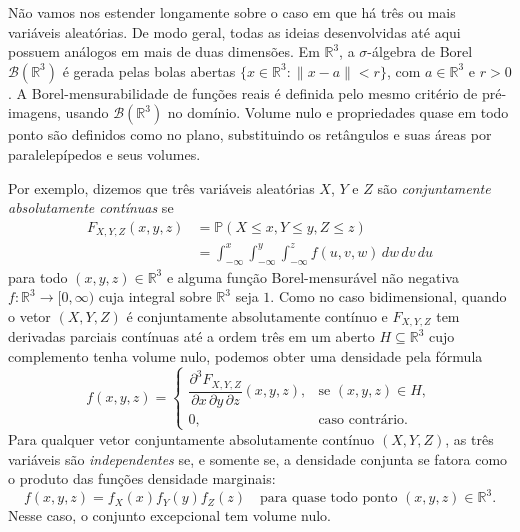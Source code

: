 \documentclass[12pt,portuguese]{article}
\theoremstyle{definition}
\theoremstyle{plainexercise}
\theoremstyle{starredexercise}
\theoremstyle{definition}
\begin{document}
Não vamos nos estender longamente sobre o caso em que há três ou mais
variáveis aleatórias. De modo geral, todas as ideias desenvolvidas até
aqui possuem análogos em mais de duas dimensões. Em $\mathbb{R}^3$, a
$\sigma$-álgebra de Borel $\mathscr{B}(\mathbb{R}^3)$ é gerada pelas bolas
abertas $\{x \in \mathbb{R}^3 : \|x-a\| < r\}$, com
$a \in \mathbb{R}^3$ e $r > 0$. A Borel-mensurabilidade de funções reais
é definida pelo mesmo critério de pré-imagens, usando
$\mathscr{B}(\mathbb{R}^3)$ no domínio. Volume nulo e propriedades quase
em todo ponto são definidos como no plano, substituindo os retângulos
e suas áreas por paralelepípedos e seus volumes.

Por exemplo, dizemos que
três variáveis aleatórias $X$, $Y$ e $Z$ são
\emph{conjuntamente absolutamente contínuas} se
\[
  \begin{aligned}
    F_{X,Y,Z}(x,y,z)
    &= \mathbb{P}(X \leqslant x, Y \leqslant y, Z \leqslant z)
    \\[0.3cm]
    &= \int_{-\infty}^{x}\int_{-\infty}^{y}\int_{-\infty}^{z}
    f(u, v, w)\,dw\,dv\,du
  \end{aligned}
\]
para todo $(x,y,z) \in \mathbb{R}^3$ e alguma função Borel-mensurável
não negativa $f:\mathbb{R}^3\to[0,\infty)$ cuja integral sobre
$\mathbb{R}^3$ seja $1$. Como no caso bidimensional, quando o vetor
$(X,Y,Z)$ é conjuntamente absolutamente contínuo e $F_{X,Y,Z}$
tem derivadas parciais contínuas até a ordem três em um aberto
$H \subseteq \mathbb{R}^3$ cujo complemento tenha volume nulo,
podemos obter uma densidade pela fórmula
\[
  f(x, y, z) =
  \begin{cases}
    \dfrac{\partial^3 F_{X,Y,Z}}{
    \partial x\,\partial y\,\partial z}(x,y,z),
    & \text{se } (x,y,z) \in H, \\[0.3cm]
    0, & \text{caso contrário}.
  \end{cases}
\]
Para qualquer vetor conjuntamente absolutamente contínuo $(X,Y,Z)$,
as três variáveis são \emph{independentes} se, e somente se, a densidade
conjunta se fatora como o produto das funções densidade marginais:
\[
  f(x, y, z) = f_X(x)f_Y(y)f_Z(z)
  \quad \text{para quase todo ponto } (x,y,z) \in \mathbb{R}^3.
\]
Nesse caso, o conjunto excepcional tem volume nulo.
\end{document}
